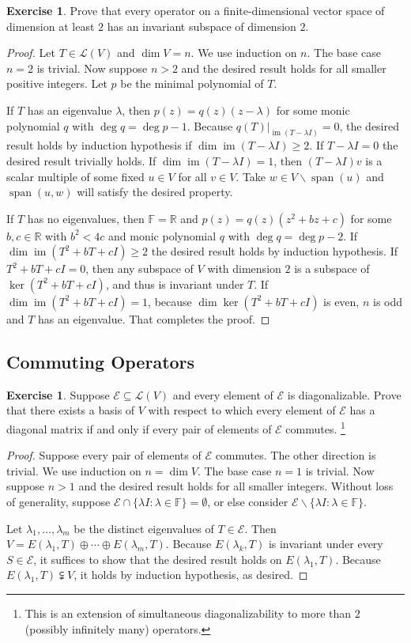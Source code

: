 \documentclass{tufte-handout}
\theoremstyle{plain} %
\theoremstyle{definition}
\newtheorem{exer}[thm]{Exercise}
\theoremstyle{remark}
\newcommand{\rest}[2]{\mathopen{}\left.#1\right|_{#2}}
\newcommand{\R}{\mathbb{R}}
\newcommand{\F}{\mathbb{F}}
\renewcommand{\L}{\mathcal{L}}
\newcommand{\E}{\mathcal{E}}
\DeclareMathOperator{\spn}{span}
\DeclareMathOperator{\im}{im}
\begin{document}
\begin{exer}
	Prove that every operator on a finite-dimensional vector space of dimension at least $2$ has an invariant subspace of dimension $2$.
\end{exer}
\begin{proof}
	Let $T\in\L(V)$ and $\dim V=n$. We use induction on $n$. The base case $n=2$ is trivial. Now suppose $n>2$ and the desired result holds for all smaller positive integers. Let $p$ be the minimal polynomial of $T$.

	If $T$ has an eigenvalue $\lambda$, then $p(z)=q(z)(z-\lambda)$ for some monic polynomial $q$ with $\deg q=\deg p-1$. Because $\rest{q(T)}{\im(T-\lambda I)}=0$, the desired result holds by induction hypothesis if $\dim\im(T-\lambda I)\geq2$. If $T-\lambda I=0$ the desired result trivially holds. If $\dim\im(T-\lambda I)=1$, then $(T-\lambda I)v$ is a scalar multiple of some fixed $u\in V$ for all $v\in V$. Take $w\in V\backslash\spn(u)$ and $\spn(u,w)$ will satisfy the desired property.

	If $T$ has no eigenvalues, then $\F=\R$ and $p(z)=q(z)(z^2+bz+c)$ for some $b,c\in\R$ with $b^2<4c$ and monic polynomial $q$ with $\deg q=\deg p-2$. If $\dim\im(T^2+bT+cI)\geq2$ the desired result holds by induction hypothesis. If $T^2+bT+cI=0$, then any subspace of $V$ with dimension $2$ is a subspace of $\ker(T^2+bT+cI)$, and thus is invariant under $T$. If $\dim\im(T^2+bT+cI)=1$, because $\dim\ker(T^2+bT+cI)$ is even, $n$ is odd and $T$ has an eigenvalue. That completes the proof.
\end{proof}



\subsection{Commuting Operators}
\begin{exer}
	Suppose $\E\subseteq\L(V)$ and every element of $\E$ is diagonalizable. Prove that there exists a basis of $V$ with respect to which every element of $\E$ has a diagonal matrix if and only if every pair of elements of $\E$ commutes.%
	\footnote{This is an extension of simultaneous diagonalizability to more than $2$ (possibly infinitely many) operators.}
\end{exer}
\begin{proof}
	Suppose every pair of elements of $\E$ commutes. The other direction is trivial. We use induction on $n=\dim V$. The base case $n=1$ is trivial. Now suppose $n>1$ and the desired result holds for all smaller integers. Without loss of generality, suppose $\E\cap\{\lambda I:\lambda\in\F\}=\emptyset$, or else consider $\E\backslash\{\lambda I:\lambda\in\F\}$.

	Let $\lambda_1,\dots,\lambda_m$ be the distinct eigenvalues of $T\in\E$. Then $V=E(\lambda_1,T)\oplus\cdots\oplus E(\lambda_m,T)$. Because $E(\lambda_k,T)$ is invariant under every $S\in\E$, it suffices to show that the desired result holds on $E(\lambda_1,T)$. Because $E(\lambda_1,T)\subsetneqq V$, it holds by induction hypothesis, as desired.
\end{proof}
\end{document}
